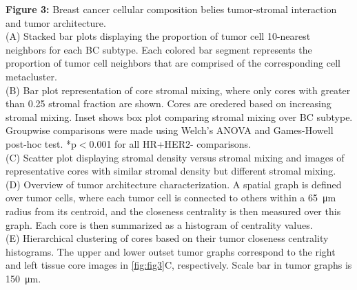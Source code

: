 \documentclass[preprint,review,3p,12pt]{elsarticle}
\begin{document}
\noindent
\textbf{Figure 3:} Breast cancer cellular composition belies tumor-stromal interaction and tumor architecture. \\
(A) Stacked bar plots displaying the proportion of tumor cell 10-nearest neighbors for each BC subtype. Each colored bar segment represents the proportion of tumor cell neighbors that are comprised of the corresponding cell metacluster. \\
(B) Bar plot representation of core stromal mixing, where only cores with greater than 0.25 stromal fraction are shown. Cores are oredered based on increasing stromal mixing. Inset shows box plot comparing stromal mixing over BC subtype. Groupwise comparisons were made using Welch's ANOVA and Games-Howell post-hoc test. *p$<$0.001 for all HR+HER2- comparisons. \\
(C) Scatter plot displaying stromal density versus stromal mixing and images of representative cores with similar stromal density but different stromal mixing.\\
(D) Overview of tumor architecture characterization. A spatial graph is defined over tumor cells, where each tumor cell is connected to others within a \SI{65}{\micro\meter} radius from its centroid, and the closeness centrality is then measured over this graph. Each core is then summarized as a histogram of centrality values. \\
(E) Hierarchical clustering of cores based on their tumor closeness centrality histograms. The upper and lower outset tumor graphs correspond to the right and left tissue core images in \autoref{fig:fig3}C, respectively. Scale bar in tumor graphs is \SI{150}{\micro\meter}.
\end{document}
